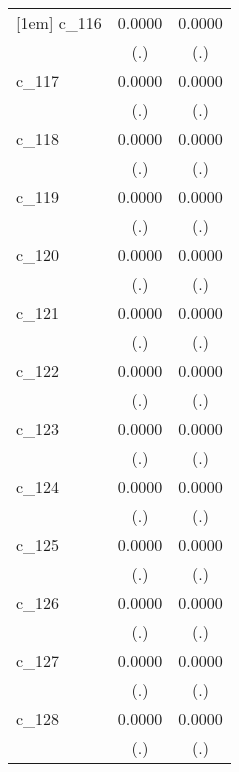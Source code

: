 {\begin{tabular}{l*{2}{c}}
[1em]
c\_116       &      0.0000        &      0.0000        \\
            &         (.)        &         (.)        \\
[1em]
c\_117       &      0.0000        &      0.0000        \\
            &         (.)        &         (.)        \\
[1em]
c\_118       &      0.0000        &      0.0000        \\
            &         (.)        &         (.)        \\
[1em]
c\_119       &      0.0000        &      0.0000        \\
            &         (.)        &         (.)        \\
[1em]
c\_120       &      0.0000        &      0.0000        \\
            &         (.)        &         (.)        \\
[1em]
c\_121       &      0.0000        &      0.0000        \\
            &         (.)        &         (.)        \\
[1em]
c\_122       &      0.0000        &      0.0000        \\
            &         (.)        &         (.)        \\
[1em]
c\_123       &      0.0000        &      0.0000        \\
            &         (.)        &         (.)        \\
[1em]
c\_124       &      0.0000        &      0.0000        \\
            &         (.)        &         (.)        \\
[1em]
c\_125       &      0.0000        &      0.0000        \\
            &         (.)        &         (.)        \\
[1em]
c\_126       &      0.0000        &      0.0000        \\
            &         (.)        &         (.)        \\
[1em]
c\_127       &      0.0000        &      0.0000        \\
            &         (.)        &         (.)        \\
[1em]
c\_128       &      0.0000        &      0.0000        \\
            &         (.)        &         (.)        \\

\end{tabular}}
